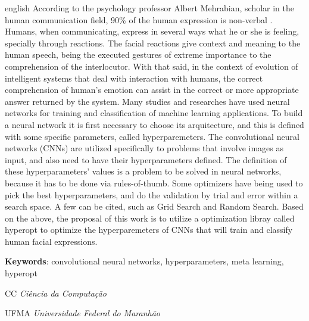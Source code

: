 \documentclass[
12pt,				%
openright,			%
oneside,			%
a4paper,			%
english,			%
french,				%
spanish,			%
brazil				%
]{abntex2}
\begin{document}
%	
\begin{resumo}[Abstract]
	\begin{otherlanguage*}{english}
	According to the psychology professor Albert Mehrabian, scholar in the human communication field, 90\% of the human expression is non-verbal \cite{mehrabian1971silent}. Humans, when communicating, express in several ways what he or she is feeling, specially through reactions. The facial reactions give context and meaning to the human speech, being the executed gestures of extreme importance to the comprehension of the interlocutor. With that said, in the context of evolution of intelligent systems that deal with interaction with humans, the correct comprehension of human's emotion can assist in the correct or more appropriate answer returned by the system. Many studies and researches have used neural networks for training and classification of machine learning applications. To build a neural network it is first necessary to choose its arquitecture, and this is defined with some specific parameters, called hyperparemeters. The convolutional neural networks (CNNs) are utilized specifically to problems that involve images as input, and also need to have their hyperparameters defined. The definition of these hyperparameters' values is a problem to be solved in neural networks, because it has to be done via rules-of-thumb. Some optimizers have being used to pick the best hyperparameters, and do the validation by trial and error within a search space. A few can be cited, such as Grid Search and Random Search. Based on the above, the proposal of this work is to utilize a optimization libray called hyperopt to optimize the hyperparemeters of CNNs that will train and classify human facial expressions.
	
	
	\textbf{Keywords}: convolutional neural networks, hyperparameters, meta learning, hyperopt
	\end{otherlanguage*}
\end{resumo}

\cleardoublepage

\listoffigures*
\cleardoublepage


\listoftables*
\cleardoublepage


\begin{siglas}
\item[CC] \textit{Ciência da Computação}
\item[UFMA] \textit{Universidade Federal do Maranhão}
\end{siglas}
\end{document}
